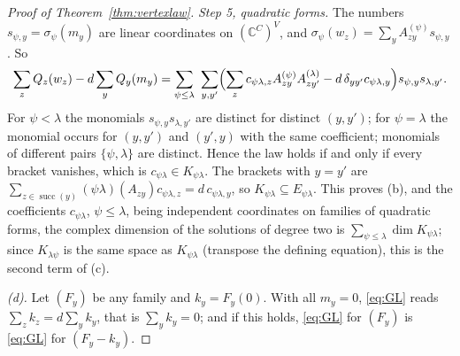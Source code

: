 \begin{proof}[Proof of Theorem~\ref{thm:vertexlaw}]
\emph{Step 5, quadratic forms.} The numbers $s_{\psi,y}=\sigma_\psi(m_y)$ are linear coordinates on $(\mathbb{C}^C)^V$, and $\sigma_\psi(w_z)=\sum_{y}A^{(\psi)}_{zy}s_{\psi,y}$. So
\[
\sum_zQ_z(w_z)-d\sum_yQ_y(m_y)=\sum_{\psi\le\lambda}\ \sum_{y,y'}\Bigl(\sum_zc_{\psi\lambda,z}A^{(\psi)}_{zy}A^{(\lambda)}_{zy'}-d\,\delta_{yy'}c_{\psi\lambda,y}\Bigr)s_{\psi,y}s_{\lambda,y'} .
\]
For $\psi<\lambda$ the monomials $s_{\psi,y}s_{\lambda,y'}$ are distinct for distinct $(y,y')$; for $\psi=\lambda$ the monomial occurs for $(y,y')$ and $(y',y)$ with the same coefficient; monomials of different pairs $\{\psi,\lambda\}$ are distinct. Hence the law holds if and only if every bracket vanishes, which is $c_{\psi\lambda}\in K_{\psi\lambda}$. The brackets with $y=y'$ are $\sum_{z\in\operatorname{succ}(y)}(\psi\lambda)(A_{zy})c_{\psi\lambda,z}=d\,c_{\psi\lambda,y}$, so $K_{\psi\lambda}\subseteq E_{\psi\lambda}$. This proves (b), and the coefficients $c_{\psi\lambda}$, $\psi\le\lambda$, being independent coordinates on families of quadratic forms, the complex dimension of the solutions of degree two is $\sum_{\psi\le\lambda}\dim K_{\psi\lambda}$; since $K_{\lambda\psi}$ is the same space as $K_{\psi\lambda}$ (transpose the defining equation), this is the second term of (c).

\emph{(d).} Let $(F_y)$ be any family and $k_y=F_y(0)$. With all $m_y=0$, \eqref{eq:GL} reads $\sum_zk_z=d\sum_yk_y$, that is $\sum_yk_y=0$; and if this holds, \eqref{eq:GL} for $(F_y)$ is \eqref{eq:GL} for $(F_y-k_y)$.
\end{proof}

